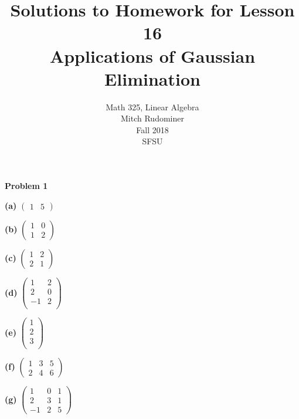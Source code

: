 \documentclass[oneside,12pt]{amsart}
\begin{document}
\title{Solutions to Homework for Lesson 16 \\ Applications of Gaussian Elimination}
\author{Math 325, Linear Algebra \\ Mitch Rudominer \\ Fall 2018 \\ SFSU }
\date{}

\maketitle


\textbf{Problem 1}

\bigskip

\textbf{(a)}
$
\begin{pmatrix}
1 & 5
\end{pmatrix}
$

\bigskip

\textbf{(b)}
$
\begin{pmatrix}
1 & 0 \\
1 & 2
\end{pmatrix}
$

\bigskip

\textbf{(c)}
$
\begin{pmatrix}
1 & 2 \\
2 & 1
\end{pmatrix}
$

\bigskip

\textbf{(d)}
$
\begin{pmatrix}
1 & 2 \\
2 & 0 \\
-1 & 2 \\
\end{pmatrix}
$

\bigskip

\textbf{(e)}
$
\begin{pmatrix}
1 \\
2 \\
3 \\
\end{pmatrix}
$

\bigskip

\textbf{(f)}
$
\begin{pmatrix}
1 & 3 & 5 \\
2 & 4 & 6
\end{pmatrix}
$

\bigskip

\textbf{(g)}
$
\begin{pmatrix}
1 & 0 & 1 \\
2 & 3 & 1 \\
-1 & 2 & 5
\end{pmatrix}
$
\end{document}
